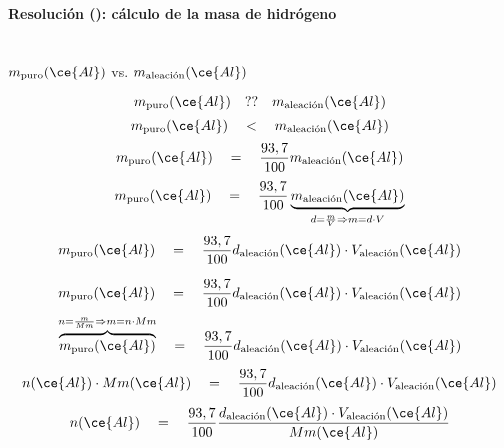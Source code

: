 \begin{frame}
    \frametitle{\ejerciciocmd}
    \framesubtitle{Resolución (): cálculo de la masa de hidrógeno}
     \\[.3cm]
     $m_{\text{puro}}(\ce{Al})$ vs. $m_{\text{aleación}}(\ce{Al})$
    \begin{overprint}
            $$
                m_{\text{puro}}(\ce{Al})
                \quad ??\quad
                m_{\text{aleación}}(\ce{Al})
            $$
            $$
                m_{\text{puro}}(\ce{Al})
                \quad <\quad 
                m_{\text{aleación}}(\ce{Al})
            $$
            $$
                m_{\text{puro}}(\ce{Al})
                \quad =\quad
                \frac{93,7}{100}
                m_{\text{aleación}}(\ce{Al})
            $$
            $$
                m_{\text{puro}}(\ce{Al})
                \quad =\quad
                \frac{93,7}{100}
                \underbrace{m_{\text{aleación}}(\ce{Al})}_{d=\frac{m}{V}\Rightarrow m=d\cdot V}
            $$
            $$
                m_{\text{puro}}(\ce{Al})
                \quad =\quad
                \frac{93,7}{100}
                d_{\text{aleación}}(\ce{Al})\cdot V_{\text{aleación}}(\ce{Al})
            $$
    \end{overprint}
    \begin{overprint}
            $$
                m_{\text{puro}}(\ce{Al})
                \quad =\quad
                \frac{93,7}{100}
                d_{\text{aleación}}(\ce{Al})\cdot V_{\text{aleación}}(\ce{Al})
            $$
            $$
                \overbrace{m_{\text{puro}}(\ce{Al})}^{n=\frac{m}{Mm}\Rightarrow m=n\cdot Mm}
                \quad =\quad
                \frac{93,7}{100}
                d_{\text{aleación}}(\ce{Al})\cdot V_{\text{aleación}}(\ce{Al})
            $$
            $$
                n(\ce{Al})\cdot Mm(\ce{Al})
                \quad =\quad
                \frac{93,7}{100}
                d_{\text{aleación}}(\ce{Al})\cdot V_{\text{aleación}}(\ce{Al})
            $$
            $$
                n(\ce{Al})
                \quad =\quad
                \frac{93,7}{100}
                \frac{d_{\text{aleación}}(\ce{Al})\cdot V_{\text{aleación}}(\ce{Al})}{Mm(\ce{Al})}
$$
\end{overprint}
\end{frame}
